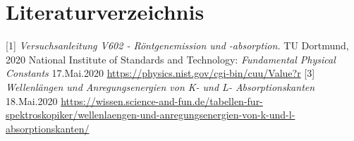 \documentclass[titlepage = firstcover]{scrartcl}
\begin{document}
           
            \newpage
            \section{Literaturverzeichnis}
                    [1] \textit{Versuchsanleitung V602 - Röntgenemission und -absorption.} TU Dortmund, 2020 \newline
                    [2] National Institute of Standards and Technology: \textit{Fundamental Physical Constants} 17.Mai.2020
                        \url{https://physics.nist.gov/cgi-bin/cuu/Value?r}
                    [3] \textit{Wellenlängen und Anregungsenergien von K- und L- Absorptionskanten} 18.Mai.2020
                        \url{https://wissen.science-and-fun.de/tabellen-fur-spektroskopiker/wellenlaengen-und-anregungsenergien-von-k-und-l-absorptionskanten/}
        
            \newpage
\end{document}
